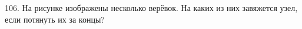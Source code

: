 106. На рисунке изображены несколько верёвок. На каких из них завяжется узел, если потянуть их за концы?
\begin{center}
\begin{figure}[ht!]
\end{figure}
\end{center}
